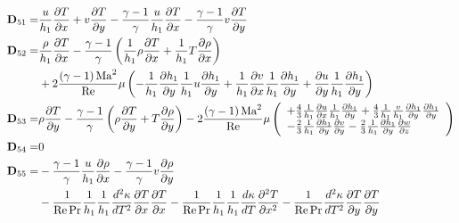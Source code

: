 \begin{align*}
  {\bf{D}}_{51}  =& \frac{u}{{h_1 }}\frac{{\partial T}}{{\partial x}} + v\frac{{\partial T}}{{\partial y}} - \frac{{\gamma  - 1}}{\gamma }\frac{u}{{h_1 }}\frac{{\partial T}}{{\partial x}} - \frac{{\gamma  - 1}}{\gamma }v\frac{{\partial T}}{{\partial y}}\\
  {\bf{D}}_{52}  =& \frac{\rho }{{h_1 }}\frac{{\partial T}}{{\partial x}} - \frac{{\gamma  - 1}}{\gamma }\left( {\frac{1}{{h_1 }}\rho \frac{{\partial T}}{{\partial x}} + \frac{1}{{h_1 }}T\frac{{\partial \rho }}{{\partial x}}} \right) \\
  &+ 2\frac{{\left( {\gamma  - 1} \right){\rm{Ma}}^2 }}{{{\mathop{\rm Re}\nolimits} }}\mu \left( { - \frac{1}{{h_1 }}\frac{{\partial h_1 }}{{\partial y}}\frac{1}{{h_1 }}u\frac{{\partial h_1 }}{{\partial y}} + \frac{1}{{h_1 }}\frac{{\partial v}}{{\partial x}}\frac{1}{{h_1 }}\frac{{\partial h_1 }}{{\partial y}} + \frac{{\partial u}}{{\partial y}}\frac{1}{{h_1 }}\frac{{\partial h_1 }}{{\partial y}}} \right)\\
  {\bf{D}}_{53}  =& \rho \frac{{\partial T}}{{\partial y}} - \frac{{\gamma  - 1}}{\gamma }\left( {\rho \frac{{\partial T}}{{\partial y}} + T\frac{{\partial \rho }}{{\partial y}}} \right) - 2\frac{{\left( {\gamma  - 1} \right){\rm{Ma}}^2 }}{{{\mathop{\rm Re}\nolimits} }}\mu \left( \begin{array}{l}
  + \frac{{\rm{4}}}{3}\frac{1}{{h_1 }}\frac{{\partial u}}{{\partial x}}\frac{1}{{h_1 }}\frac{{\partial h_1 }}{{\partial y}} + \frac{{\rm{4}}}{3}\frac{1}{{h_1 }}\frac{v}{{h_1 }}\frac{{\partial h_1 }}{{\partial y}}\frac{{\partial h_1 }}{{\partial y}} \\
  - \frac{{\rm{2}}}{3}\frac{1}{{h_1 }}\frac{{\partial h_1 }}{{\partial y}}\frac{{\partial v}}{{\partial y}} - \frac{{\rm{2}}}{3}\frac{1}{{h_1 }}\frac{{\partial h_1 }}{{\partial y}}\frac{{\partial w}}{{\partial z}} \\
 \end{array} \right)\\
  {\bf{D}}_{54}  =& 0 \\
  {\bf{D}}_{55}  =& - \frac{{\gamma  - 1}}{\gamma }\frac{u}{{h_1 }}\frac{{\partial \rho }}{{\partial x}} - \frac{{\gamma  - 1}}{\gamma }v\frac{{\partial \rho }}{{\partial y}}\\
  & - \frac{1}{{{\mathop{\rm Re}\nolimits} \Pr }}\frac{1}{{h_1 }}\frac{1}{{h_1 }}\frac{{d^2 \kappa }}{{dT^2 }}\frac{{\partial T}}{{\partial x}}\frac{{\partial T}}{{\partial x}} - \frac{1}{{{\mathop{\rm Re}\nolimits} \Pr }}\frac{1}{{h_1 }}\frac{1}{{h_1 }}\frac{{d\kappa }}{{dT}}\frac{{\partial ^2 T}}{{\partial x^2 }} - \frac{1}{{{\mathop{\rm Re}\nolimits} \Pr }}\frac{{d^2 \kappa }}{{dT^2 }}\frac{{\partial T}}{{\partial y}}\frac{{\partial T}}{{\partial y}}\\

\end{align*}
